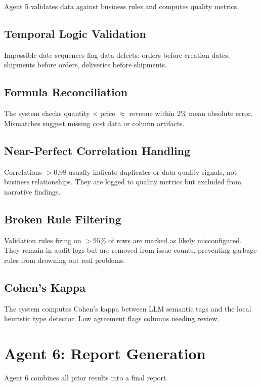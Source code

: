 Agent 5 validates data against business rules and computes quality metrics.

\subsection{Temporal Logic Validation}

Impossible date sequences flag data defects: orders before creation dates, shipments before orders, deliveries before shipments.

\subsection{Formula Reconciliation}

The system checks quantity $\times$ price $\approx$ revenue within 2\% mean absolute error. Mismatches suggest missing cost data or column artifacts.

\subsection{Near-Perfect Correlation Handling}

Correlations $> 0.98$ usually indicate duplicates or data quality signals, not business relationships. They are logged to quality metrics but excluded from narrative findings.

\subsection{Broken Rule Filtering}

Validation rules firing on $>95\%$ of rows are marked as likely misconfigured. They remain in audit logs but are removed from issue counts, preventing garbage rules from drowning out real problems.

\subsection{Cohen's Kappa}

The system computes Cohen's kappa between LLM semantic tags and the local heuristic type detector. Low agreement flags columns needing review.

\section{Agent 6: Report Generation}

Agent 6 combines all prior results into a final report.

